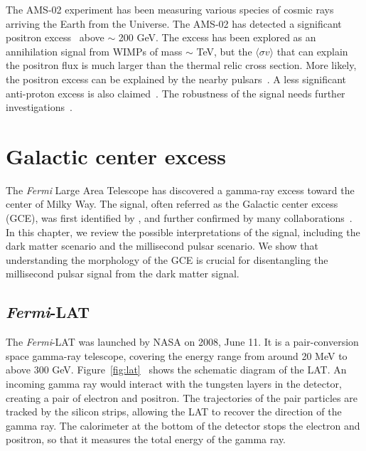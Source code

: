 \documentclass[doublespace,nopageskip]{VTthesis} %
\newcommand{\sigmav}{\langle\sigma v\rangle}
\begin{document}
The AMS-02 experiment has been measuring various species of cosmic rays arriving the Earth from the Universe. The AMS-02 has detected a significant positron excess~\cite{2014PhRvL.113l1101A} above $\sim$ 200 GeV. The excess has been explored as an annihilation signal from WIMPs of mass $\sim$ TeV, but the $\sigmav$ that can explain the positron flux is much larger than the thermal relic cross section. More likely, the positron excess can be explained by the nearby pulsars~\cite{2009JCAP...01..025H}. A less significant anti-proton excess is also claimed~\cite{2017PhRvL.118s1101C}. The robustness of the signal needs further investigations~\cite{2019PhRvD..99j3026C, 2021arXiv210714606H}.


\chapter{Galactic center excess} \label{ch:GCE}

The \emph{Fermi} Large Area Telescope has discovered a gamma-ray excess toward the center of Milky Way. The signal, often referred as the Galactic center excess (GCE), was first identified by \citet{2009arXiv0910.2998G}, and further confirmed by many collaborations~\cite{2009arXiv0912.3828V,2011PhLB..697..412H,2012PhRvD..86h3511A,2013PhRvD..88h3521G,2014PhRvD..89f3515M,2013PDU.....2..118H,2014PhRvD..90b3526A,2016PDU....12....1D,2015JCAP...03..038C,2015PhRvD..91l3010Z,2016ApJ...819...44A,2017ApJ...840...43A}. In this chapter, we review the possible interpretations of the signal, including the dark matter scenario and the millisecond pulsar scenario. We show that understanding the morphology of the GCE is crucial for disentangling the millisecond pulsar signal from the dark matter signal.

\section{\textit{Fermi}-LAT}

The \textit{Fermi}-LAT was launched by NASA on 2008, June 11. It is a pair-conversion space gamma-ray telescope, covering the energy
range from around 20 MeV to above 300 GeV. Figure~\ref{fig:lat}~\cite{2009ApJ...697.1071A} shows the schematic diagram of the LAT. An incoming gamma ray would interact with the tungsten layers in the detector, creating a pair of electron and positron. The trajectories of the pair particles are tracked by the silicon strips, allowing the LAT to recover the direction of the gamma ray. The calorimeter at the bottom of the detector stops the electron and positron, so that it measures the total energy of the gamma ray.
\end{document}
